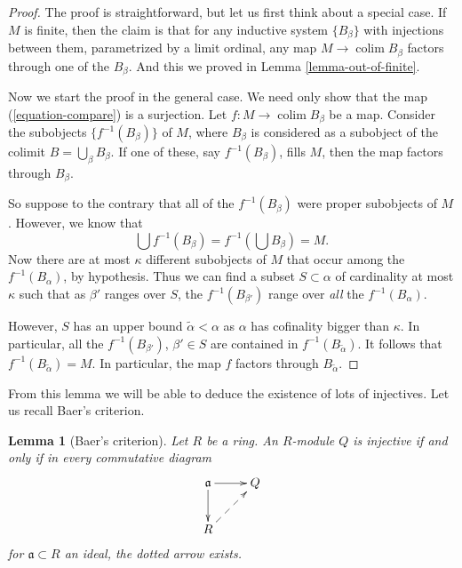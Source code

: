\documentclass{stacks-project}
\newenvironment{reference}{\comment}{\endcomment}
\theoremstyle{plain}
\newtheorem{lemma}[subsection]{Lemma}
\theoremstyle{definition}
\theoremstyle{remark}
\numberwithin{equation}{subsection}
\def\colim{\mathop{\mathrm{colim}}\nolimits}
\begin{document}
\begin{proof}
The proof is straightforward, but let us first think about a special case.
If $M$ is finite, then the claim is that for any inductive system
$\{B_\beta\}$ with injections between them, parametrized by a
limit ordinal, any map $M \to \colim B_\beta$ factors through one of
the $B_\beta$. And this we proved in
Lemma \ref{lemma-out-of-finite}.

\medskip\noindent
Now we start the proof in the general case.
We need only show that the map (\ref{equation-compare}) is a surjection.
Let $f : M \to \colim B_\beta$ be a map.
Consider the subobjects $\{f^{-1}(B_\beta)\}$ of $M$, where $B_\beta$
is considered as a subobject of the colimit $B = \bigcup_\beta B_\beta$.
If one of these, say $f^{-1}(B_\beta)$, fills $M$,
then the map factors through $B_\beta$.

\medskip\noindent
So suppose to the contrary that all of the $f^{-1}(B_\beta)$ were proper
subobjects of $M$. However, we know that
$$
\bigcup f^{-1}(B_\beta) = f^{-1}\left(\bigcup B_\beta\right) = M.
$$
Now there are at most $\kappa$ different subobjects of $M$ that occur among
the $f^{-1}(B_\alpha)$, by hypothesis.
Thus we can find a subset $S \subset \alpha$ of cardinality at most
$\kappa$ such that as $\beta'$ ranges over $S$, the
$f^{-1}(B_{\beta'})$ range over \emph{all} the $f^{-1}(B_\alpha)$.

\medskip\noindent
However, $S$ has an upper bound $\widetilde{\alpha} < \alpha$ as
$\alpha$ has cofinality bigger than $\kappa$. In particular, all the
$f^{-1}(B_{\beta'})$, $\beta' \in S$ are contained in
$f^{-1}(B_{\widetilde{\alpha}})$.
It follows that $f^{-1}(B_{\widetilde{\alpha}}) = M$.
In particular, the map $f$ factors through $B_{\widetilde{\alpha}}$.
\end{proof}

\noindent
From this lemma we will be able to deduce the existence of lots of injectives.
Let us recall Baer's criterion.

\begin{lemma}[Baer's criterion]
\label{lemma-criterion-baer}
\begin{reference}
\cite[Theorem 1]{Baer}
\end{reference}
Let $R$ be a ring. An $R$-module $Q$ is injective if and only if in every
commutative diagram
$$
\xymatrix{
\mathfrak{a} \ar[d] \ar[r] &  Q \\
R \ar@{-->}[ru]
}
$$
for $\mathfrak{a} \subset R$ an ideal, the dotted arrow exists.
\end{lemma}
\end{document}
